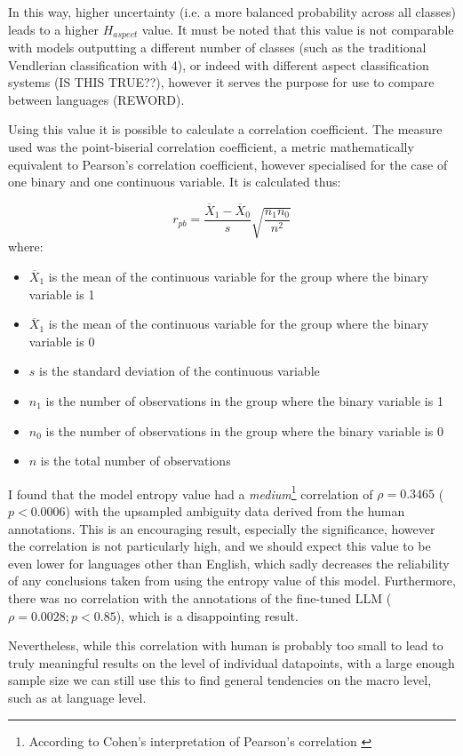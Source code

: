 In this way, higher uncertainty (i.e. a more balanced probability across all classes) leads to a higher $H_{aspect}$ value. It must be noted that this value is not comparable with models outputting a different number of classes (such as the traditional Vendlerian classification with 4), or indeed with different aspect classification systems (IS THIS TRUE??), however it serves the purpose for use to compare between languages (REWORD).

Using this value it is possible to calculate a correlation coefficient. The measure used was the point-biserial correlation coefficient, a metric mathematically equivalent to Pearson's correlation coefficient, however specialised for the case of one binary and one continuous variable. It is calculated thus:

$$r_{pb} = \frac{\overline{X}_1 - \overline{X}_0}{s} \sqrt{\frac{n_1 n_0}{n^2}}$$
where:
\begin{itemize}
    \item $\overline{X}_1$ is the mean of the continuous variable for the group where the binary variable is 1
    \item $\overline{X}_1$ is the mean of the continuous variable for the group where the binary variable is 0
    \item $s$ is the standard deviation of the continuous variable
    \item $n_1$ is the number of observations in the group where the binary variable is 1
    \item $n_0$ is the number of observations in the group where the binary variable is 0
    \item $n$ is the total number of observations
\end{itemize}

I found that the model entropy value had a \emph{medium}\footnote{According to Cohen's interpretation of Pearson's correlation \citep{cohen1988spa}} correlation of $\rho = 0.3465$ ($p < 0.0006$) with the upsampled ambiguity data derived from the human annotations. This is an encouraging result, especially the significance, however the correlation is not particularly high, and we should expect this value to be even lower for languages other than English, which sadly decreases the reliability of any conclusions taken from using the entropy value of this model. Furthermore, there was no correlation with the annotations of the fine-tuned LLM ($\rho = 0.0028; p < 0.85$), which is a disappointing result.

Nevertheless, while this correlation with human is probably too small to lead to truly meaningful results on the level of individual datapoints, with a large enough sample size we can still use this to find general tendencies on the macro level, such as at language level.

